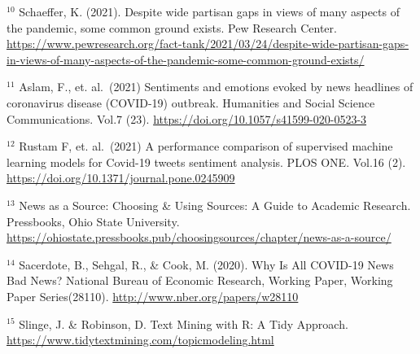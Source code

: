 \documentclass[
]{article}
\begin{document}
\(^{10}\) Schaeffer, K. (2021). Despite wide partisan gaps in views of
many aspects of the pandemic, some common ground exists. Pew Research
Center.
\url{https://www.pewresearch.org/fact-tank/2021/03/24/despite-wide-partisan-gaps-in-views-of-many-aspects-of-the-pandemic-some-common-ground-exists/}

\(^{11}\) Aslam, F., et. al.~(2021) Sentiments and emotions evoked by
news headlines of coronavirus disease (COVID-19) outbreak. Humanities
and Social Science Communications. Vol.7 (23).
\url{https://doi.org/10.1057/s41599-020-0523-3}

\(^{12}\) Rustam F, et. al.~(2021) A performance comparison of
supervised machine learning models for Covid-19 tweets sentiment
analysis. PLOS ONE. Vol.16 (2).
\url{https://doi.org/10.1371/journal.pone.0245909}

\(^{13}\) News as a Source: Choosing \& Using Sources: A Guide to
Academic Research. Pressbooks, Ohio State University.
\url{https://ohiostate.pressbooks.pub/choosingsources/chapter/news-as-a-source/}

\(^{14}\) Sacerdote, B., Sehgal, R., \& Cook, M. (2020). Why Is All
COVID-19 News Bad News? National Bureau of Economic Research, Working
Paper, Working Paper Series(28110).
\url{http://www.nber.org/papers/w28110}

\(^{15}\) Slinge, J. \& Robinson, D. Text Mining with R: A Tidy
Approach. \url{https://www.tidytextmining.com/topicmodeling.html}
\end{document}
